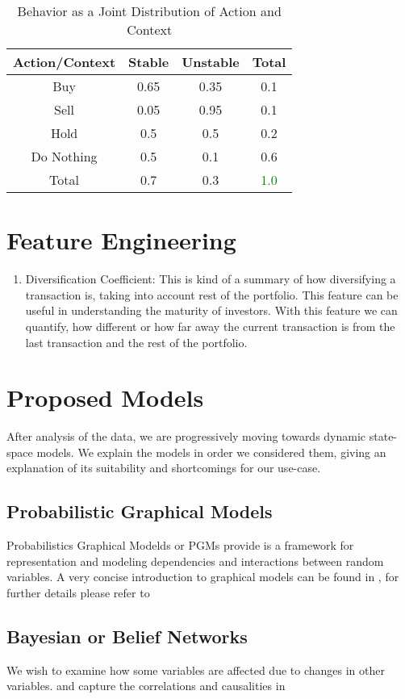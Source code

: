 \documentclass[a4paper]{article}
\begin{document}
\begin{table}[!htbp]
\centering
\caption{Behavior as a Joint Distribution of Action and Context}
\begin{tabular}{|c|c|c|c|} \hline
Action/Context & Stable & Unstable & Total\\ \hline
Buy & 0.65 & 0.35 & 0.1\\ \hline
Sell & 0.05 & 0.95 & 0.1\\ \hline
Hold & 0.5 & 0.5 & 0.2\\ \hline
Do Nothing & 0.5 & 0.1 & 0.6\\ \hline
Total & 0.7 & 0.3 & \textcolor{green}{1.0}\\
\hline\end{tabular}
\end{table}
\section{Feature Engineering}
\begin{enumerate}
    \item Diversification Coefficient: This is kind of a summary of how diversifying a transaction is, taking into account rest of the portfolio. This feature can be useful in understanding the maturity of investors. With this feature we can quantify, how different or how far away the current transaction is from the last transaction and the rest of the portfolio.
\end{enumerate}
\section{Proposed Models}
After analysis of the data, we are progressively moving towards dynamic state-space models. We explain the models in order we considered them, giving an explanation of its suitability and shortcomings for our use-case.
\subsection{Probabilistic Graphical Models}
Probabilistics Graphical Modelds or PGMs provide is a framework for representation and modeling dependencies and interactions between random variables. A very concise introduction to graphical models can be found in \cite{JordanANAcknowledgments}, for further details please refer to \cite{Koller2009ProbabilisticTechniques}
\subsection{Bayesian or Belief Networks}
We wish to examine how some variables are affected due to changes in other variables. and capture the correlations and causalities in  
\end{document}
